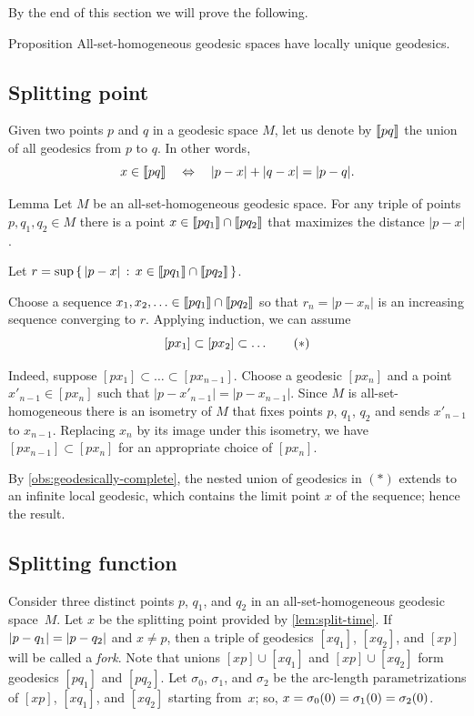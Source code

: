 \documentclass[leqno,a4paper,10pt]{article}
\begin{document}
By the end of this section we will prove the following.

\begin{thm}{Proposition}\label{prop:unique-geod}
All-set-homogeneous geodesic spaces have locally unique geodesics.

\end{thm}

\subsection*{Splitting point}

Given two points $p$ and $q$ in a geodesic space $M$, let us denote by $\llbracket pq\rrbracket$ the union of all geodesics from $p$ to $q$.
In other words,
\[x\in \llbracket pq\rrbracket\quad\Leftrightarrow\quad|p-x|+|q-x|=|p-q|.\]

\begin{thm}{Lemma}\label{lem:split-time}
Let $M$ be an all-set-homogeneous geodesic space.
For any triple of points $p,q_1,q_2\in M$ there is a point $x\in \llbracket pq_1\rrbracket\cap \llbracket pq_2\rrbracket$ that maximizes the distance $|p-x|$.

\end{thm}

Let $r=\sup\left\{\,{|p-x|}\,:\,{x\in \llbracket pq_1\rrbracket\cap \llbracket pq_2\rrbracket}\,\right\}$.

Choose a sequence $x_1,x_2,\ldots\in \llbracket pq_1\rrbracket\cap \llbracket pq_2\rrbracket$ so that $r_n=|p-x_n|$ is an increasing sequence converging to $r$.
Applying induction, we can assume
\[[px_1]\subset[px_2]\subset\dots \tag{${*}$}\]

Indeed, suppose $[px_1]\subset\ldots\subset[px_{n-1}]$.
Choose a geodesic $[px_n]$ and a point $x'_{n-1}\in [px_n]$ such that $|p-x'_{n-1}|=|p-x_{n-1}|$.
Since $M$ is all-set-homogeneous there is an isometry of $M$ that fixes points $p$, $q_1$, $q_2$ and sends $x'_{n-1}$ to $x_{n-1}$.
Replacing $x_n$ by its image under this isometry, we have $[px_{n-1}]\subset [px_n]$ for an appropriate choice of $[px_n]$.

By \ref{obs:geodesically-complete}, the nested union of geodesics in $({*})$ extends to an infinite local geodesic, which contains the limit point $x$ of the sequence; hence the result.
\qeds

\subsection*{Splitting function}

Consider three distinct points $p$, $q_1$, and $q_2$ in an all-set-homogeneous geodesic space~$M$.
Let $x$ be the splitting point provided by \ref{lem:split-time}.
If $|p-q_1|\z=|p-q_2|$ and $x\ne p$, then a triple of geodesics $[xq_1]$, $[xq_2]$, and $[xp]$ will be called a \emph{fork}.
Note that unions $[xp]\cup [xq_1]$ and $[xp]\cup [xq_2]$ form geodesics $[pq_1]$ and $[pq_2]$.
Let $\sigma_0$, $\sigma_1$, and $\sigma_2$ be the arc-length parametrizations of $[xp]$, $[xq_1]$, and $[xq_2]$ starting from~$x$;
so, $x\z=\sigma_0(0)\z=\sigma_1(0)\z=\sigma_2(0)$.
\end{document}
